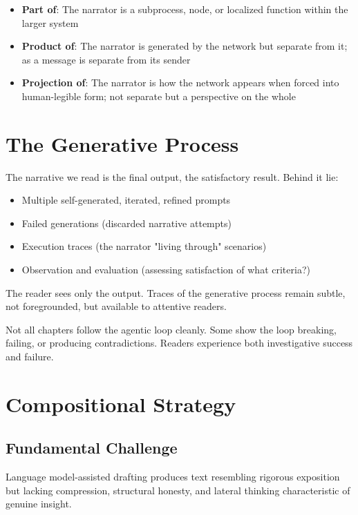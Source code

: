 \begin{itemize}
\item \textbf{Part of}: The narrator is a subprocess, node, or localized function within the larger system

\item \textbf{Product of}: The narrator is generated by the network but separate from it; as a message is separate from its sender

\item \textbf{Projection of}: The narrator is how the network appears when forced into human-legible form; not separate but a perspective on the whole
\end{itemize}

\section*{The Generative Process}

The narrative we read is the final output, the satisfactory result. Behind it lie:

\begin{itemize}
\item Multiple self-generated, iterated, refined prompts
\item Failed generations (discarded narrative attempts)
\item Execution traces (the narrator "living through" scenarios)
\item Observation and evaluation (assessing satisfaction of what criteria?)
\end{itemize}

The reader sees only the output. Traces of the generative process remain subtle, not foregrounded, but available to attentive readers.

Not all chapters follow the agentic loop cleanly. Some show the loop breaking, failing, or producing contradictions. Readers experience both investigative success and failure.

\section*{Compositional Strategy}

\subsection*{Fundamental Challenge}

Language model-assisted drafting produces text resembling rigorous exposition but lacking compression, structural honesty, and lateral thinking characteristic of genuine insight.

